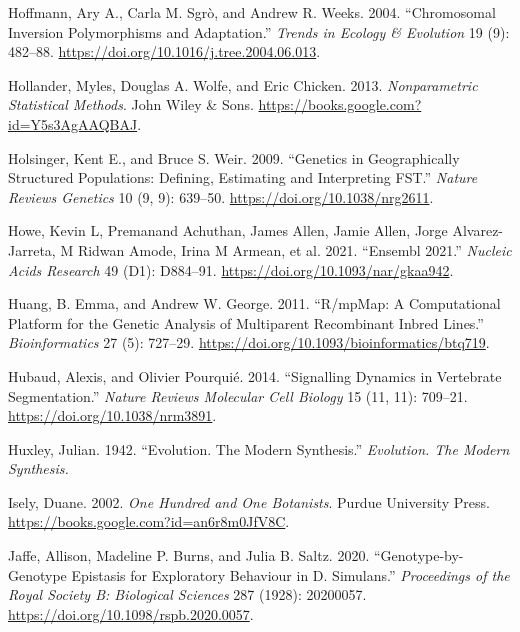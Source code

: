 \documentclass[
]{book}
\newlength{\cslhangindent}
\newlength{\cslentryspacingunit} %
\newenvironment{CSLReferences}[2] %
 {%
  \setlength{\parindent}{0pt}
  \ifodd #1
  \let\oldpar\par
  \def\par{\hangindent=\cslhangindent\oldpar}
  \fi
  \setlength{\parskip}{#2\cslentryspacingunit}
 }%
 {}
\begin{document}
\begin{CSLReferences}{1}{0}
\leavevmode{}%
Hoffmann, Ary A., Carla M. Sgrò, and Andrew R. Weeks. 2004. {``Chromosomal Inversion Polymorphisms and Adaptation.''} \emph{Trends in Ecology \& Evolution} 19 (9): 482--88. \url{https://doi.org/10.1016/j.tree.2004.06.013}.

\leavevmode{}%
Hollander, Myles, Douglas A. Wolfe, and Eric Chicken. 2013. \emph{Nonparametric {Statistical Methods}}. {John Wiley \& Sons}. \url{https://books.google.com?id=Y5s3AgAAQBAJ}.

\leavevmode{}%
Holsinger, Kent E., and Bruce S. Weir. 2009. {``Genetics in Geographically Structured Populations: Defining, Estimating and Interpreting {FST}.''} \emph{Nature Reviews Genetics} 10 (9, 9): 639--50. \url{https://doi.org/10.1038/nrg2611}.

\leavevmode{}%
Howe, Kevin L, Premanand Achuthan, James Allen, Jamie Allen, Jorge Alvarez-Jarreta, M Ridwan Amode, Irina M Armean, et al. 2021. {``Ensembl 2021.''} \emph{Nucleic Acids Research} 49 (D1): D884--91. \url{https://doi.org/10.1093/nar/gkaa942}.

\leavevmode{}%
Huang, B. Emma, and Andrew W. George. 2011. {``R/{mpMap}: A Computational Platform for the Genetic Analysis of Multiparent Recombinant Inbred Lines.''} \emph{Bioinformatics} 27 (5): 727--29. \url{https://doi.org/10.1093/bioinformatics/btq719}.

\leavevmode{}%
Hubaud, Alexis, and Olivier Pourquié. 2014. {``Signalling Dynamics in Vertebrate Segmentation.''} \emph{Nature Reviews Molecular Cell Biology} 15 (11, 11): 709--21. \url{https://doi.org/10.1038/nrm3891}.

\leavevmode{}%
Huxley, Julian. 1942. {``Evolution. {The} Modern Synthesis.''} \emph{Evolution. The Modern Synthesis.}

\leavevmode{}%
Isely, Duane. 2002. \emph{One {Hundred} and {One Botanists}}. {Purdue University Press}. \url{https://books.google.com?id=an6r8m0JfV8C}.

\leavevmode{}%
Jaffe, Allison, Madeline P. Burns, and Julia B. Saltz. 2020. {``Genotype-by-Genotype Epistasis for Exploratory Behaviour in {D}. Simulans.''} \emph{Proceedings of the Royal Society B: Biological Sciences} 287 (1928): 20200057. \url{https://doi.org/10.1098/rspb.2020.0057}.


\end{CSLReferences}
\end{document}
